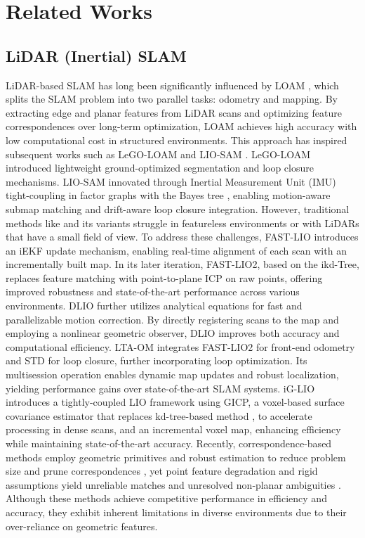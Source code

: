 \section{Related Works}
\vspace{-0.5mm}
\subsection{LiDAR (Inertial) SLAM}
\vspace{-1mm}

LiDAR-based SLAM has long been significantly influenced by LOAM \cite{LOAM}, which splits the SLAM problem into two parallel tasks: odometry and mapping. By extracting edge and planar features from LiDAR scans and optimizing feature correspondences over long-term optimization, LOAM achieves high accuracy with low computational cost in structured environments. This approach has inspired subsequent works such as LeGO-LOAM \cite{LeGO-LOAM} and LIO-SAM \cite{LIO-SAM}. LeGO-LOAM introduced lightweight ground-optimized segmentation and loop closure mechanisms. LIO-SAM innovated through Inertial Measurement Unit (IMU) tight-coupling in factor graphs \cite{FactorGraph} with the Bayes tree \cite{ISAM2}, enabling motion-aware submap matching and drift-aware loop closure integration. However, traditional methods like \cite{LOAM} and its variants struggle in featureless environments or with LiDARs that have a small field of view. To address these challenges, FAST-LIO \cite{FAST-LIO} introduces an iEKF update mechanism, enabling real-time alignment of each scan with an incrementally built map. In its later iteration, FAST-LIO2, based on the ikd-Tree, replaces feature matching with point-to-plane ICP on raw points, offering improved robustness and state-of-the-art performance across various environments. DLIO \cite{DLIO} further utilizes analytical equations for fast and parallelizable motion correction. By directly registering scans to the map and employing a nonlinear geometric observer, DLIO improves both accuracy and computational efficiency. LTA-OM \cite{LTAOM} integrates FAST-LIO2 for front-end odometry and STD \cite{STD} for loop closure, further incorporating loop optimization. Its multisession operation enables dynamic map updates and robust localization, yielding performance gains over state-of-the-art SLAM systems. iG-LIO \cite{ig-lio} introduces a tightly-coupled LIO framework using GICP, a voxel-based surface covariance estimator that replaces kd-tree-based method \cite{GICP}, \cite{VGICP} to accelerate processing in dense scans, and an incremental voxel map, enhancing efficiency while maintaining state-of-the-art accuracy. Recently, correspondence-based methods employ geometric primitives and robust estimation to reduce problem size and prune correspondences \cite{TEASER, Quatro}, yet point feature degradation and rigid assumptions yield unreliable matches and unresolved non‑planar ambiguities \cite{Segregator, Outram}. Although these methods achieve competitive performance in efficiency and accuracy, they exhibit inherent limitations in diverse environments due to their over-reliance on geometric features.
